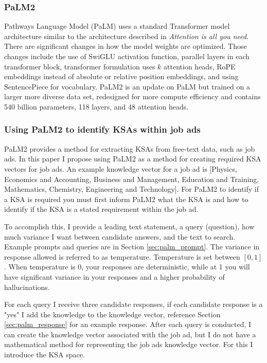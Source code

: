 \documentclass[12pt]{article}
\begin{document}
\subsubsection{PaLM2}

Pathways Language Model (PaLM) uses a standard Transformer model architecture similar to the architecture described in \textit{Attention is all you need}.\cite{attention} There are significant changes in how the model weights are optimized. Those changes include the use of SwiGLU activation function, parallel layers in each transformer block, transformer formulation uses $k$ attention heads, RoPE embeddings instead of absolute or relative position embeddings, and using SentencePiece for vocabulary.\cite{palm} PaLM2 is an update on PaLM but trained on a larger more diverse data set, redesigned for more compute efficiency and contains 540 billion parameters, 118 layers, and 48 attention heads.\cite{palm2} 

\subsubsection{Using PaLM2 to identify KSAs within job ads}

PaLM2 provides a method for extracting KSAs from free-text data, such as job ads. In this paper I propose using PaLM2 as a method for creating required KSA vectors for job ads. An example knowledge vector for a job ad is [Physics, Economics and Accounting, Business and Management, Education and Training, Mathematics, Chemistry, Engineering and Technology]. For PaLM2 to identify if a KSA is required you must first inform PaLM2 what the KSA is and how to identify if the KSA is a stated requirement within the job ad. 

To accomplish this, I provide a leading text statement, a query (question), how much variance I want between candidate answers, and the text to search. Example prompts and queries are in Section \ref{sec:palm_prompt}. The variance in response allowed is referred to as temperature. Temperature is set between $[0,1]$. When temperature is 0, your responses are deterministic, while at 1 you will have significant variance in your responses and a higher probability of hallucinations. 

For each query I receive three candidate responses, if each candidate response is a "yes" I add the knowledge to the knowledge vector, reference Section \ref{sec:palm_response} for an example response. After each query is conducted, I can create the knowledge vector associated with the job ad, but I do not have a mathematical method for representing the job ads knowledge vector. For this I introduce the KSA space.
\end{document}
